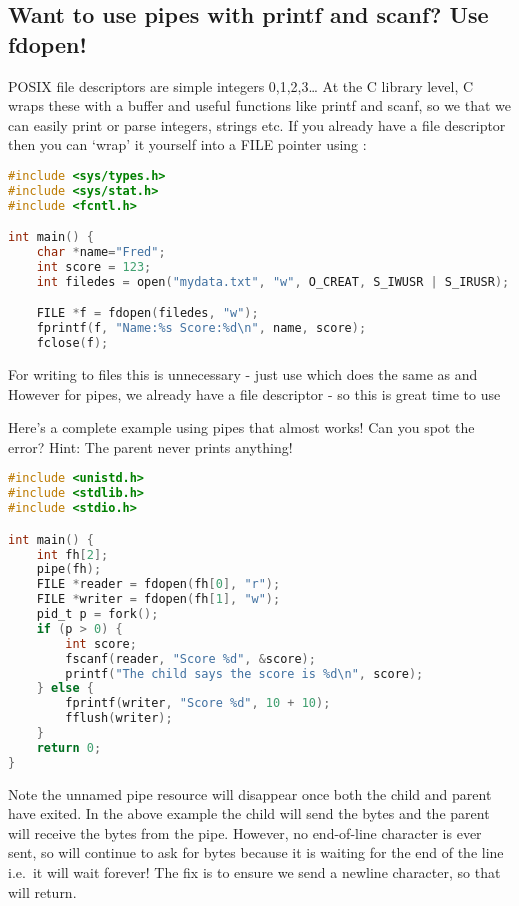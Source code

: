 \subsection{Want to use pipes with printf and scanf? Use fdopen!}

 POSIX file descriptors are simple integers 0,1,2,3\ldots{} At the C library level, C wraps these with a buffer and useful functions like printf and scanf, so we that we can easily print or parse integers, strings etc. If you already have a file descriptor then you can `wrap' it yourself into a FILE pointer using  :

\begin{lstlisting}[language=C]
#include <sys/types.h>
#include <sys/stat.h>
#include <fcntl.h>

int main() {
    char *name="Fred";
    int score = 123;
    int filedes = open("mydata.txt", "w", O_CREAT, S_IWUSR | S_IRUSR);

    FILE *f = fdopen(filedes, "w");
    fprintf(f, "Name:%s Score:%d\n", name, score);
    fclose(f);
\end{lstlisting}

For writing to files this is unnecessary - just use  which does the same as  and  However for pipes, we already have a file descriptor - so this is great time to use  

Here's a complete example using pipes that almost works! Can you spot the error? Hint: The parent never prints anything!

\begin{lstlisting}[language=C]
#include <unistd.h>
#include <stdlib.h>
#include <stdio.h>

int main() {
    int fh[2];
    pipe(fh);
    FILE *reader = fdopen(fh[0], "r");
    FILE *writer = fdopen(fh[1], "w");
    pid_t p = fork();
    if (p > 0) {
        int score;
        fscanf(reader, "Score %d", &score);
        printf("The child says the score is %d\n", score);
    } else {
        fprintf(writer, "Score %d", 10 + 10);
        fflush(writer);
    }
    return 0;
}
\end{lstlisting}

Note the unnamed pipe resource will disappear once both the child and parent have exited. In the above example the child will send the bytes and the parent will receive the bytes from the pipe. However, no end-of-line character is ever sent, so  will continue to ask for bytes because it is waiting for the end of the line i.e.~it will wait forever! The fix is to ensure we send a newline character, so that  will return.

